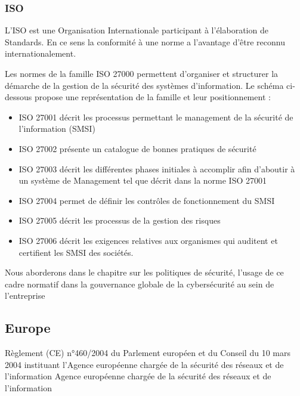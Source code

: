 \subsubsection{ISO}


L’ISO est une Organisation Internationale participant à l’élaboration de Standards. En ce sens la conformité à une norme a l’avantage d’être reconnu internationalement.
 
Les normes de la famille ISO 27000 permettent d’organiser et structurer la démarche de la gestion de la sécurité des systèmes d’information. Le schéma ci-dessous propose une représentation de la famille et leur positionnement : 

\begin{itemize}
  \item ISO 27001 décrit les processus permettant le management de la sécurité de l’information (SMSI)
  \item ISO 27002 présente un catalogue de bonnes pratiques de sécurité
  \item ISO 27003 décrit les différentes phases initiales à accomplir afin d’aboutir à un système de Management tel que décrit dans la norme ISO 27001
  \item ISO 27004 permet de définir les contrôles de fonctionnement du SMSI
  \item ISO 27005 décrit les processus de la gestion des risques
  \item ISO 27006 décrit les exigences relatives aux organismes qui auditent et certifient les SMSI des sociétés.
\end{itemize}

Nous aborderons dans le chapitre sur les politiques de sécurité, l'usage de ce cadre normatif dans la gouvernance globale de la cybersécurité au sein de l'entreprise


\subsection{Europe}

Règlement (CE) n°460/2004 du Parlement européen et du Conseil
du 10 mars 2004
instituant l'Agence européenne chargée de la sécurité des réseaux et de l'information
Agence européenne chargée de la sécurité des réseaux et de l'information

